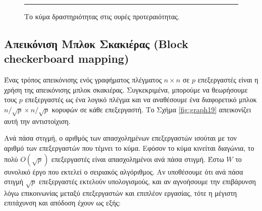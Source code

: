 \documentclass[12pt,a4paper]{article} %
\begin{document}
{{\begin{figure}[H]
\noindent\rule{\textwidth}{0.2pt}
\caption{Το κύμα δραστηριότητας στις ουρές προτεραιότητας.}
\label{fig:graph18}
\end{figure}

\subsection*{Απεικόνιση Μπλοκ Σκακιέρας (Block checkerboard mapping)}
Ένας τρόπος απεικόνισης
ενός γραφήματος πλέγματος $n \times n$ σε $p$ επεξεργαστές είναι η χρήση
της απεικόνισης μπλοκ σκακιέρας. Συγκεκριμένα,
μπορούμε να θεωρήσουμε τους $p$ επεξεργαστές ως ένα λογικό πλέγμα και
να αναθέσουμε ένα διαφορετικό μπλοκ $n/\sqrt{p} \times n/\sqrt{p}$
κορυφών σε κάθε επεξεργαστή. Το Σχήμα \ref{fig:graph19} απεικονίζει αυτή την
αντιστοίχιση.

Ανά πάσα στιγμή, ο αριθμός των απασχολημένων επεξεργαστών ισούται με
τον αριθμό των επεξεργαστών που τέμνει το κύμα. Εφόσον το κύμα
κινείται διαγώνια, το πολύ $O(\sqrt{p})$ επεξεργαστές είναι
απασχολημένοι ανά πάσα στιγμή. Έστω $W$ το συνολικό έργο που εκτελεί
ο σειριακός αλγόριθμος. Αν υποθέσουμε ότι ανά πάσα στιγμή $\sqrt{p}$
επεξεργαστές εκτελούν υπολογισμούς, και αν αγνοήσουμε την επιβάρυνση
λόγω επικοινωνίας μεταξύ επεξεργαστών και επιπλέον εργασίας, τότε η
μέγιστη επιτάχυνση και απόδοση έχουν ως εξής:

}}
\end{document}
